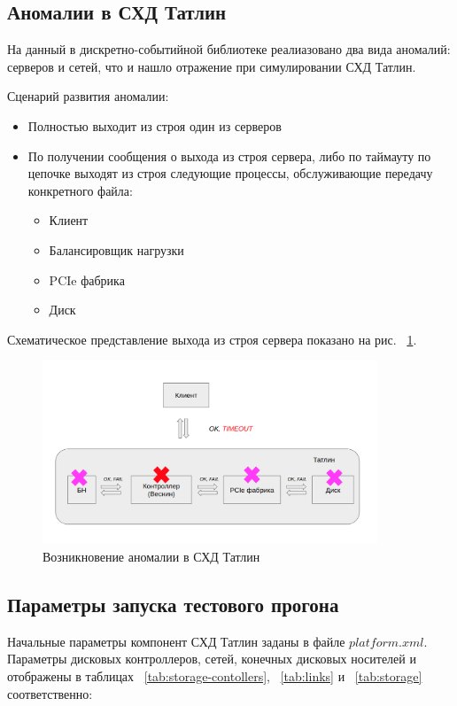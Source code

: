 \subsection{Аномалии в СХД Татлин}
На данный в дискретно-событийной библиотеке реалиазовано два вида аномалий: серверов и сетей, что и нашло отражение при симулировании СХД Татлин.

Сценарий развития аномалии:

\begin{itemize}
\item Полностью выходит из строя один из серверов 
\item По получении сообщения о выхода из строя сервера, либо по таймауту по цепочке выходят из строя следующие процессы, обслуживающие передачу конкретного файла:
	\begin{itemize}
		\item  Клиент
		\item Балансировщик нагрузки
		\item PCIe фабрика
		\item Диск
	\end{itemize}
\end{itemize}

Схематическое представление выхода из строя сервера показано на рис. ~\ref{fig:bad-tatlin}.

\begin{figure}[!ht]
\centering
\includegraphics[width=10cm]{Kenenbek/images/bad.png}
\caption{Возникновение аномалии в СХД Татлин}
\label{fig:bad-tatlin}
\end{figure}

\subsection{Параметры запуска тестового прогона}

Начальные параметры компонент СХД Татлин заданы в файле $platform.xml$. Параметры дисковых контроллеров, сетей, конечных дисковых носителей и отображены в таблицах ~\ref{tab:storage-contollers}, ~\ref{tab:links} и ~\ref{tab:storage} соответственно:

